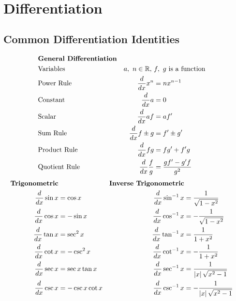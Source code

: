 \section{Differentiation}

\subsection*{Common Differentiation Identities}
\begin{align*}
   & \text{\textbf{General Differentiation}}                                                        \\
   & \text{Variables}                     & a,~n \in \mathbb{R},~        & f,~g~\text{is a function} \\
   & \text{Power Rule}                    & \frac{d}{dx} x^n         & = nx^{n-1}                \\
   & \text{Constant}                      & \frac{d}{dx} a           & = 0                       \\
   & \text{Scalar}                        & \frac{d}{dx} af          & = af'                     \\
   & \text{Sum Rule}                      & \frac{d}{dx} f \pm g     & = f' \pm g'               \\
   & \text{Product Rule}                  & \frac{d}{dx}fg           & = fg' + f'g               \\
   & \text{Quotient Rule}                 & \frac{d}{dx} \frac{f}{g} & = \frac{gf'-g'f}{g^2}     \\
\end{align*}
\begin{align*}
  \text{\textbf{Trigonometric}} &                  & \text{\textbf{Inverse Trigonometric}}                                                       \\
  \frac{d}{dx} \sin x        & = \cos x         & \frac{d}{dx} \sin^{-1} x           & = \frac{1}{\sqrt{1-x^2}}                            \\
  \frac{d}{dx} \cos x        & = -\sin x        & \frac{d}{dx} \cos^{-1} x           & = -\frac{1}{\sqrt{1-x^2}}                           \\
  \frac{d}{dx} \tan x        & = \sec^2 x       & \frac{d}{dx} \tan^{-1} x           & = \frac{1}{1+x^2}                                   \\
  \frac{d}{dx} \cot x        & = -\csc^2 x      & \frac{d}{dx} \cot^{-1} x           & = -\frac{1}{1+x^2}                                  \\
  \frac{d}{dx} \sec x        & = \sec x \tan x  & \frac{d}{dx} \sec^{-1} x           & = \frac{1}{\left\lvert x\right\rvert \sqrt{x^2-1}}  \\
  \frac{d}{dx} \csc x        & = -\csc x \cot x & \frac{d}{dx} \csc^{-1} x           & = -\frac{1}{\left\lvert x\right\rvert \sqrt{x^2-1}}
\end{align*}
